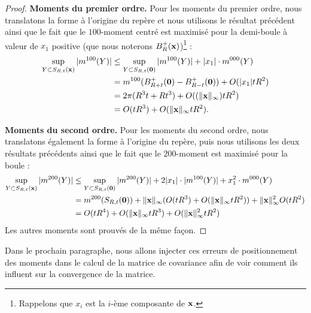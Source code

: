 \begin{proof}
\noindent\textbf{Moments du premier ordre.\quad}
%
Pour les moments du premier ordre, nous translatons la forme à l'origine du
repère et nous utilisons le résultat précédent ainsi que le fait que le
$100$-moment centré est maximisé pour la demi-boule à valeur de $x_1$ positive
(que nous noterons $B^+_{R}(\mathbf{x})$)\footnote{Rappelons que $x_i$ est la
$i$-ème composante de $\mathbf{x}$.} :
%
\begin{align}
  \sup_{Y \subset S_{R,t}(\mathbf{x})} |m^{100}(Y)|
  &\le \sup_{Y \subset S_{R,t}(\mathbf{0})} |m^{100}(Y)| + |x_1|\cdot m^{000}(Y)\nonumber \\
  &= m^{100}( B^+_{R+t}(\mathbf{0}) - B^+_{R-t}(\mathbf{0}) ) + O(|x_1|tR^2) \nonumber \\
  &= 2\pi(R^3t +Rt^3) + O( (\| \mathbf{x} \|_\infty) tR^2) \nonumber \\
  &= O(tR^3) + O(\| \mathbf{x} \|_\infty tR^2).
\end{align}


\noindent\textbf{Moments du second ordre.\quad}
%
Pour les moments du second ordre, nous translatons également la forme à
l'origine du repère, puis nous utilisons les deux résultats précédents ainsi que
le fait que le $200$-moment est maximisé pour la boule :
%
\begin{align}
  \sup_{Y \subset S_{R,t}(\mathbf{x})} |m^{200}(Y)| &
  \le \sup_{Y \subset S_{R,t}(\mathbf{0})} |m^{200}(Y)| + 2|x_1|\cdot |m^{100}(Y)| + x_1^2\cdot m^{000}(Y) \nonumber \\
  & = m^{200}(S_{R,t}(\mathbf{0})) + \|\mathbf{x}\|_\infty (O(tR^3) + O(\|\mathbf{x}\|_\infty tR^2))+  \|\mathbf{x}\|_\infty^2 O(tR^2) \nonumber \\
  & = O(tR^4) +O(\|\mathbf{x}\|_\infty tR^3) +O(\|\mathbf{x}\|_\infty^2 tR^2)
\end{align}
%
Les autres moments sont prouvés de la même façon.
%
\end{proof}

\noindent Dans le prochain paragraphe, nous allons injecter ces erreurs de
positionnement des moments dans le calcul de la matrice de covariance afin de
voir comment ils influent sur la convergence de la matrice.

